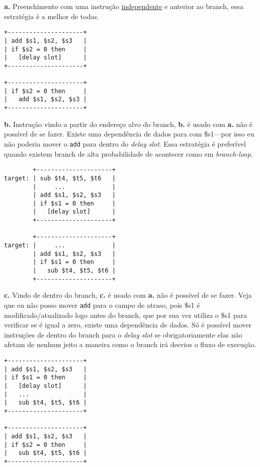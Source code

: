 \documentclass{article}
\begin{document}
\begin{enumerate}
\textbf{a.} Preenchimento com uma instrução \underline{independente} e anterior 
ao branch, essa estratégia é a melhor de todas.

\begin{verbatim}
+---------------------+
| add $s1, $s2, $s3   |
| if $s2 = 0 then     |
|   [delay slot]      |
+---------------------+

+---------------------+
| if $s2 = 0 then     |
|   add $s1, $s2, $s3 |
+---------------------+
\end{verbatim}

\textbf{b.} Instrução vindo a partir do endereço alvo do branch, \textbf{b.} é 
usado com \textbf{a.} não é possível de se fazer. Existe uma dependência de 
dados para com \$s1---por isso eu não poderia mover o \verb|add| para dentro do 
\textit{delay} \textit{slot}. Essa estratégia é preferível quando existem 
branch de alta probabilidade de acontecer como em \textit{branch-loop}.

\begin{verbatim}
        +---------------------+
target: | sub $t4, $t5, $t6   |
        |     ...             |
        | add $s1, $s2, $s3   |
        | if $s1 = 0 then     |
        |   [delay slot]      |
        +---------------------+

        +---------------------+
target: |     ...             |
        | add $s1, $s2, $s3   |
        | if $s1 = 0 then     |
        |   sub $t4, $t5, $t6 |
        +---------------------+
\end{verbatim}

\textbf{c.} Vindo de dentro do branch, \textbf{c.} é usado com \textbf{a.} não 
é possível de se fazer. Veja que eu não posso mover \verb|add| para o campo de 
atraso, pois \$s1 é modificado/atualizado logo antes do branch, que por sua vez 
utiliza o \$s1 para verificar se é igual a zero, existe uma dependência de 
dados. Só é possível mover instruções de dentro do branch para o \textit{delay} 
\textit{slot} se obrigatoriamente elas não afetam de nenhum jeito a maneira 
como o branch irá desvios o fluxo de execução.

\begin{verbatim}
+---------------------+
| add $s1, $s2, $s3   |
| if $s1 = 0 then     |
|   [delay slot]      |
|   ...               |
|   sub $t4, $t5, $t6 |
+---------------------+

+---------------------+
| add $s1, $s2, $s3   |
| if $s2 = 0 then     |
|   sub $t4, $t5, $t6 |
+---------------------+
\end{verbatim}


\end{enumerate}
\end{document}
